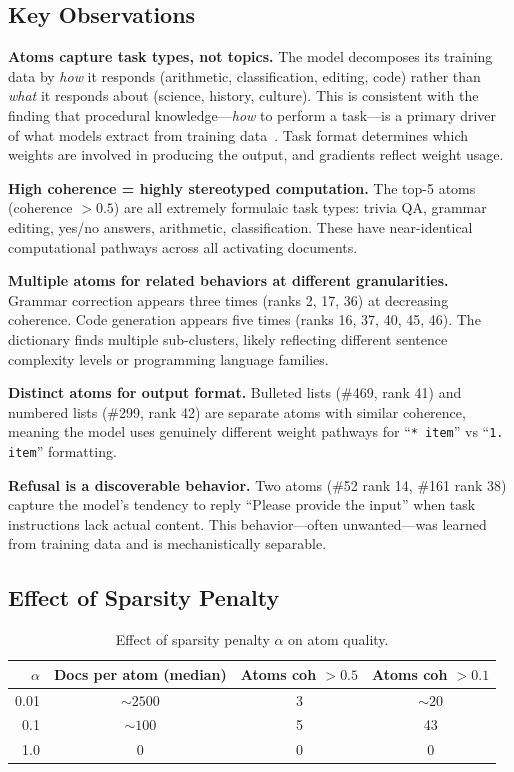 \documentclass{article} %
\begin{document}
\subsection{Key Observations}

\textbf{Atoms capture task types, not topics.} The model decomposes its training data by \emph{how} it responds (arithmetic, classification, editing, code) rather than \emph{what} it responds about (science, history, culture). This is consistent with the finding that procedural knowledge---\emph{how} to perform a task---is a primary driver of what models extract from training data~\citep{ruis2024procedural}. Task format determines which weights are involved in producing the output, and gradients reflect weight usage.

\textbf{High coherence = highly stereotyped computation.} The top-5 atoms (coherence $>0.5$) are all extremely formulaic task types: trivia QA, grammar editing, yes/no answers, arithmetic, classification. These have near-identical computational pathways across all activating documents.

\textbf{Multiple atoms for related behaviors at different granularities.} Grammar correction appears three times (ranks 2, 17, 36) at decreasing coherence. Code generation appears five times (ranks 16, 37, 40, 45, 46). The dictionary finds multiple sub-clusters, likely reflecting different sentence complexity levels or programming language families.

\textbf{Distinct atoms for output format.} Bulleted lists (\#469, rank 41) and numbered lists (\#299, rank 42) are separate atoms with similar coherence, meaning the model uses genuinely different weight pathways for ``\texttt{* item}'' vs ``\texttt{1. item}'' formatting.

\textbf{Refusal is a discoverable behavior.} Two atoms (\#52 rank 14, \#161 rank 38) capture the model's tendency to reply ``Please provide the input'' when task instructions lack actual content. This behavior---often unwanted---was learned from training data and is mechanistically separable.

\subsection{Effect of Sparsity Penalty}

\begin{table}[h!]
\centering
\caption{Effect of sparsity penalty $\alpha$ on atom quality.}
\label{tab:sparsity}
\begin{tabular}{rccc}
\toprule
$\alpha$ & Docs per atom (median) & Atoms coh $> 0.5$ & Atoms coh $> 0.1$ \\
\midrule
0.01 & ${\sim}2500$ & 3 & ${\sim}20$ \\
0.1  & ${\sim}100$  & 5 & 43 \\
1.0  & 0            & 0 & 0 \\
\bottomrule
\end{tabular}
\end{table}
\end{document}
